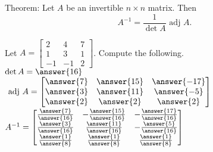 \documentclass{ximera}
\newcommand{\adj}{\text{ adj }}
\begin{document}
          \begin{question} Theorem: Let $A$ be an invertible $n\times n$ matrix. Then $$A^{-1} = \dfrac{1}{\det A}  \adj  A.$$
          	
          Let $A = \begin{bmatrix} 2& 4& 7\\ 1& 3&1\\ -1&-1&2\end{bmatrix}$. Compute the following.\vspace{10pt}\\
          
          $\det A = \answer{16}$\vspace{10pt}\\
          
          $\adj A = \begin{bmatrix} 
          \answer{7} & \answer{15} &\answer{-17}\\
          \answer{3} & \answer{11} &\answer{-5}\\
          \answer{2} & \answer{2} &\answer{2} \end{bmatrix}$\vspace{10pt}\\
          
      
          
          $A^{-1} =   \begin{bmatrix} 
          	\frac{\answer{7}}{\answer{16}} & -\frac{\answer{15}}{\answer{16}} &-\frac{\answer{17}}{\answer{16}}\\
          	\frac{\answer{3}}{\answer{16}}& \frac{\answer{11}}{\answer{16}} &-\frac{\answer{5}}{\answer{16}}\\
          	\frac{\answer{1}}{\answer{8} }& \frac{\answer{1}}{\answer{8}} &\frac{\answer{1}}{\answer{8}} \end{bmatrix}$
          	
          	
          \end{question}	
  
\end{document}
